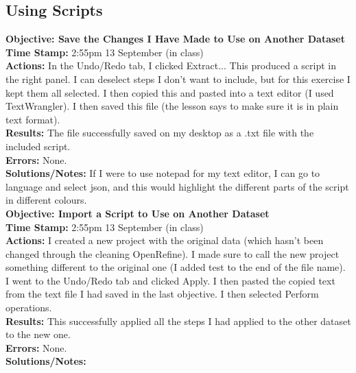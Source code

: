 \documentclass{article}
\begin{document}
\begin{FlushLeft}
\subsection{Using Scripts}
\textbf{Objective: Save the Changes I Have Made to Use on Another Dataset}\\ 
\textbf{Time Stamp:} 2:55pm 13 September (in class)\\
\textbf{Actions:} In the Undo/Redo tab, I clicked Extract... This produced a script in the right panel. I can deselect steps I don't want to include, but for this exercise I kept them all selected. I then copied this and pasted into a text editor (I used TextWrangler). I then saved this file (the lesson says to make sure it is in plain text format).\\
\textbf{Results:} The file successfully saved on my desktop as a .txt file with the included script. \\
\textbf{Errors:} None.\\
\textbf{Solutions/Notes:} If I were to use notepad for my text editor, I can go to language and select json, and this would highlight the different parts of the script in different colours.\\
\vspace{5mm}
\textbf{Objective: Import a Script to Use on Another Dataset}\\ 
\textbf{Time Stamp:} 2:55pm 13 September (in class)\\
\textbf{Actions:} I created a new project with the original data (which hasn't been changed through the cleaning OpenRefine). I made sure to call the new project something different to the original one (I added test to the end of the file name). I went to the Undo/Redo tab and clicked Apply. I then pasted the copied text from the text file I had saved in the last objective. I then selected Perform operations. \\
\textbf{Results:} This successfully applied all the steps I had applied to the other dataset to the new one. \\
\textbf{Errors:} None.\\
\textbf{Solutions/Notes:}\\
\vspace{5mm}


\end{FlushLeft}
\end{document}
